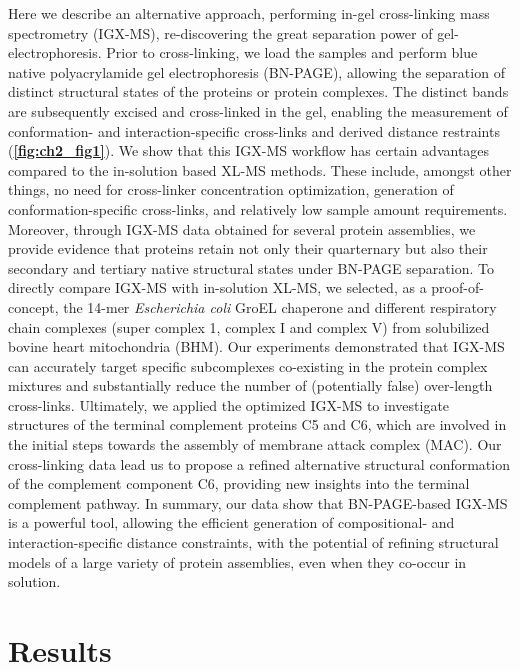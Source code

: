 Here we describe an alternative approach, performing in-gel cross-linking mass spectrometry (IGX-MS), re-discovering the great separation power of gel-electrophoresis. Prior to cross-linking, we load the samples and perform blue native polyacrylamide gel electrophoresis (BN-PAGE), allowing the separation of distinct structural states of the proteins or protein complexes. The distinct bands are subsequently excised and cross-linked in the gel, enabling the measurement of conformation- and interaction-specific cross-links and derived distance restraints (\textbf{\autoref{fig:ch2_fig1}}). We show that this IGX-MS workflow has certain advantages compared to the in-solution based XL-MS methods. These include, amongst other things, no need for cross-linker concentration optimization, generation of conformation-specific cross-links, and relatively low sample amount requirements. Moreover, through IGX-MS data obtained for several protein assemblies, we provide evidence that proteins retain not only their quarternary but also their secondary and tertiary native structural states under BN-PAGE separation. To directly compare IGX-MS with in-solution XL-MS, we selected, as a proof-of-concept, the 14-mer \emph{Escherichia coli} GroEL chaperone and different respiratory chain complexes (super complex 1, complex I and complex V) from solubilized bovine heart mitochondria (BHM). Our experiments demonstrated that IGX-MS can accurately target specific subcomplexes co-existing in the protein complex mixtures and substantially reduce the number of (potentially false) over-length cross-links. Ultimately, we applied the optimized IGX-MS to investigate structures of the terminal complement proteins C5 and C6, which are involved in the initial steps towards the assembly of membrane attack complex (MAC). Our cross-linking data lead us to propose a refined alternative structural conformation of the complement component C6, providing new insights into the terminal complement pathway. In summary, our data show that BN-PAGE-based IGX-MS is a powerful tool, allowing the efficient generation of compositional- and interaction-specific distance constraints, with the potential of refining structural models of a large variety of protein assemblies, even when they co-occur in solution.
%
\section{Results}

